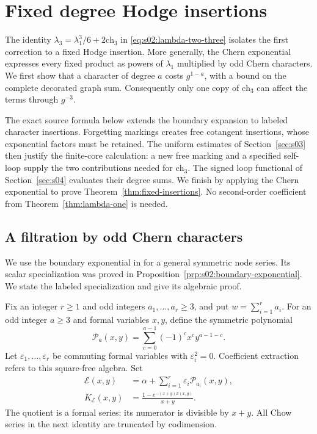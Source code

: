 \documentclass[a4paper,10pt]{article}
\numberwithin{equation}{section}
\theoremstyle{paperplain}
\theoremstyle{paperremark}
\theoremstyle{paperplain}
\begin{document}
\section{Fixed degree Hodge insertions}
\label{sec:s05}

The identity $\lambda_3=\lambda_1^3/6+2\mathrm{ch}_3$ in
\eqref{eq:s02:lambda-two-three} isolates the first correction to a
fixed Hodge insertion. More generally, the Chern exponential expresses
every fixed product as powers of $\lambda_1$ multiplied by odd Chern
characters. We first show that a character of degree $a$ costs
$g^{1-a}$, with a bound on the complete decorated graph sum.
Consequently only one copy of $\mathrm{ch}_3$ can affect the terms
through $g^{-3}$.

The exact source formula below extends the boundary expansion to
labeled character insertions. Forgetting markings creates free
cotangent insertions, whose exponential factors must be retained.
The uniform estimates of Section~\ref{sec:s03} then justify the
finite-core calculation: a new free marking and a specified self-loop
supply the two contributions needed for $\mathrm{ch}_3$. The signed
loop functional of Section~\ref{sec:s04} evaluates their degree sums.
We finish by applying the Chern exponential to prove
Theorem~\ref{thm:fixed-insertions}. No second-order coefficient from
Theorem~\ref{thm:lambda-one} is needed.

\subsection{A filtration by odd Chern characters}
\label{subsec:s05:01}

We use the boundary exponential in
\cite[Lemma~3.10, (3.18)--(3.21)]{ABCDGLW23} for a general symmetric
node series. Its scalar specialization was proved in
Proposition~\ref{prp:s02:boundary-exponential}. We state the labeled
specialization and give its algebraic proof.

Fix an integer $r\geq1$ and odd integers $a_1,\ldots,a_r\geq3$,
and put $w=\sum_{i=1}^r a_i$. For an odd integer $a\geq3$ and formal variables $x,y$, define
the symmetric polynomial
\begin{equation}\label{eq:s05:node-polynomial}
 \mathcal P_a(x,y)=\sum_{c=0}^{a-1}(-1)^c x^c y^{a-1-c}.
\end{equation}
Let $\varepsilon_1,\ldots,\varepsilon_r$ be commuting formal
variables with $\varepsilon_i^2=0$. Coefficient extraction refers to
this square-free algebra. Set
\begin{equation}\label{eq:s05:source-kernel}
\begin{split}
 \mathcal E(x,y)&=\alpha+
       \sum_{i=1}^r\varepsilon_i\mathcal P_{a_i}(x,y),\\
 K_{\mathcal E}(x,y)&=
       \frac{1-e^{-(x+y)\mathcal E(x,y)}}{x+y}.
\end{split}
\end{equation}
The quotient is a formal series: its numerator is divisible by $x+y$.
All Chow series in the next identity are truncated by codimension.
\end{document}

